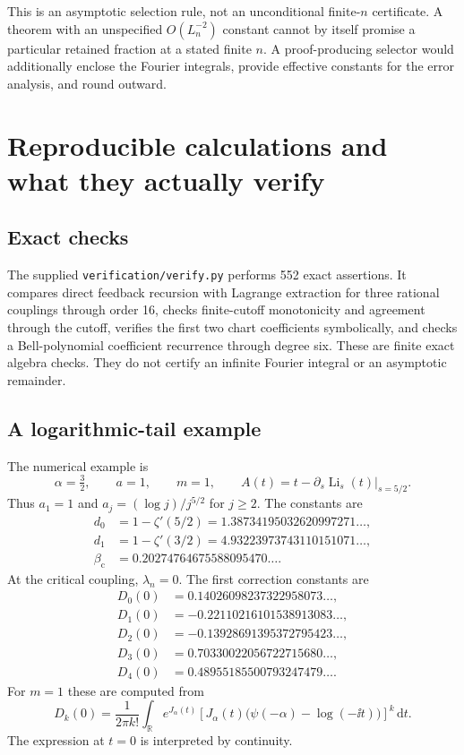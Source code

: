 \documentclass[11pt,a4paper]{article}
\numberwithin{equation}{section}
\theoremstyle{definition}\newtheorem{definition}[theorem]{Definition}
\theoremstyle{remark}\newtheorem{remark}[theorem]{Remark}
\theoremstyle{definition}
\DeclareMathOperator{\Li}{Li}
\newcommand{\R}{\mathbb R}\newcommand{\C}{\mathbb C}
\newcommand{\bc}{\beta_{\mathrm c}}\newcommand{\rhoc}{\rho_{\mathrm c}}
\newcommand{\dd}{\,\mathrm d}
\begin{document}
This is an asymptotic selection rule, not an unconditional finite-$n$
certificate. A theorem with an unspecified $O(L_n^{-2})$ constant cannot
by itself promise a particular retained fraction at a stated finite $n$.
A proof-producing selector would additionally enclose the Fourier integrals,
provide effective constants for the error analysis, and round outward.

\section{Reproducible calculations and what they actually verify}
\label{sec:computations}

\subsection{Exact checks}
The supplied \texttt{verification/verify.py} performs 552 exact assertions.
It compares direct feedback recursion with Lagrange extraction for three
rational couplings through order 16, checks finite-cutoff monotonicity and
agreement through the cutoff, verifies the first two chart coefficients
symbolically, and checks a Bell-polynomial coefficient recurrence through
degree six. These are finite exact algebra checks. They do not certify
an infinite Fourier integral or an asymptotic remainder.

\subsection{A logarithmic-tail example}
The numerical example is
\begin{equation}\label{eq:numericalmodel}
 \alpha=\tfrac32,\qquad a=1,\qquad m=1,\qquad
 A(t)=t-\left.\partial_s\Li_s(t)\right|_{s=5/2}.
\end{equation}
Thus $a_1=1$ and $a_j=(\log j)/j^{5/2}$ for $j\ge2$. The constants are
\begin{align*}
 d_0&=1-\zeta'(5/2)=1.38734195032620997271\ldots,\\
 d_1&=1-\zeta'(3/2)=4.93223973743110151071\ldots,\\
 \bc&=0.20274764675588095470\ldots.
\end{align*}
At the critical coupling, $\lambda_n=0$. The first correction constants are
\begin{align*}
 D_0(0)&= 0.14026098237322958073\ldots,\\
 D_1(0)&=-0.22110216101538913083\ldots,\\
 D_2(0)&=-0.13928691395372795423\ldots,\\
 D_3(0)&= 0.70330022056722715680\ldots,\\
 D_4(0)&= 0.48955185500793247479\ldots.
\end{align*}
For $m=1$ these are computed from
\[
 D_k(0)=\frac1{2\pi k!}\int_\R e^{J_\alpha(t)}
 \left[J_\alpha(t)\bigl(\psi(-\alpha)-\log(-\ii t)\bigr)\right]^k\dd t.
\]
The expression at $t=0$ is interpreted by continuity.
\end{document}
